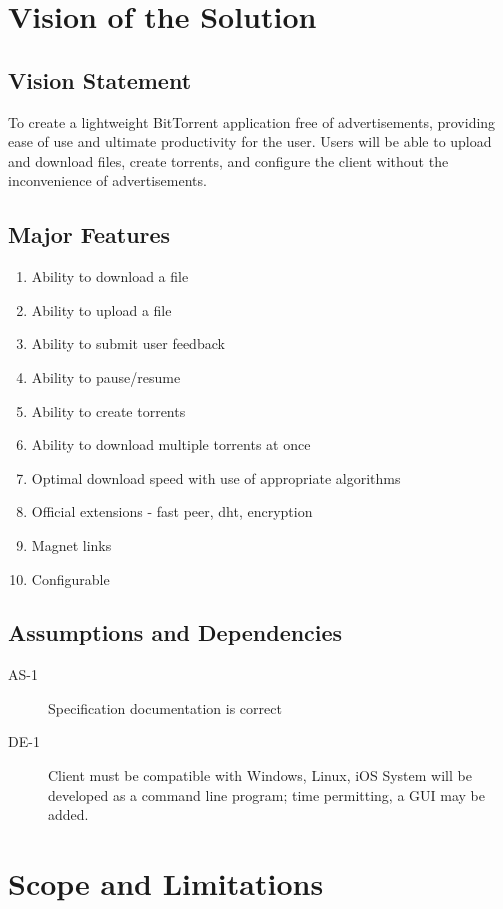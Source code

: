 \documentclass[letter]{scrartcl}
\begin{document}
\section{Vision of the Solution}
\subsection{Vision Statement}
To create a lightweight BitTorrent application free of advertisements, providing ease of use and ultimate productivity for the user.  Users will be able to upload and download files, create torrents, and configure the client without the inconvenience of advertisements.
\subsection{Major Features}
\begin{enumerate}
\item Ability to download a file
\item Ability to upload a file
\item Ability to submit user feedback
\item Ability to pause/resume
\item Ability to create torrents
\item Ability to download multiple torrents at once
\item Optimal download speed with use of appropriate algorithms
\item Official extensions - fast peer, dht, encryption
\item Magnet links
\item Configurable
\end{enumerate}

\subsection{Assumptions and Dependencies}
\begin{description}
\item[AS-1] Specification documentation is correct
\item[DE-1] Client must be compatible with Windows, Linux, iOS
System will be developed as a command line program; time permitting, a GUI may be added.
\end{description}

\section{Scope and Limitations}
\end{document}
